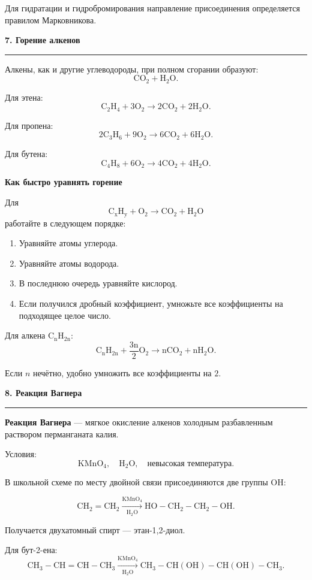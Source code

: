 \documentclass[a4paper,12pt]{article}
\newcommand{\topic}[1]{%
    \vspace{0.5em}
    {\Large\bfseries\textcolor{darkaccent}{#1}}\par
    \vspace{0.25em}
    {\color{accent}\rule{\linewidth}{0.7pt}}
    \vspace{0.4em}
}
\newcommand{\subtopic}[1]{%
    \vspace{0.35em}
    {\large\bfseries\textcolor{accent}{#1}}\par
}
\newcommand{\important}[1]{\textbf{\textcolor{darkaccent}{#1}}}
\begin{document}
Для гидратации и гидробромирования направление присоединения определяется правилом Марковникова.


\topic{7. Горение алкенов}

Алкены, как и другие углеводороды, при полном сгорании образуют:
\[
\boxed{\mathrm{CO_2+H_2O}}.
\]

Для этена:
\[
\mathrm{C_2H_4+3O_2\longrightarrow2CO_2+2H_2O}.
\]

Для пропена:
\[
\mathrm{2C_3H_6+9O_2\longrightarrow6CO_2+6H_2O}.
\]

Для бутена:
\[
\mathrm{C_4H_8+6O_2\longrightarrow4CO_2+4H_2O}.
\]

\subtopic{Как быстро уравнять горение}

Для
\[
\mathrm{C_xH_y+O_2\longrightarrow CO_2+H_2O}
\]
работайте в следующем порядке:

\begin{enumerate}
    \item Уравняйте атомы углерода.
    \item Уравняйте атомы водорода.
    \item В последнюю очередь уравняйте кислород.
    \item Если получился дробный коэффициент, умножьте все коэффициенты на подходящее целое число.
\end{enumerate}

Для алкена \(\mathrm{C_nH_{2n}}\):
\[
\mathrm{C_nH_{2n}+\frac{3n}{2}O_2
\longrightarrow nCO_2+nH_2O}.
\]

Если \(n\) нечётно, удобно умножить все коэффициенты на \(2\).


\topic{8. Реакция Вагнера}

\important{Реакция Вагнера} --- мягкое окисление алкенов холодным разбавленным раствором перманганата калия.

Условия:
\[
\mathrm{KMnO_4},\quad \mathrm{H_2O},\quad
\text{невысокая температура}.
\]

В школьной схеме по месту двойной связи присоединяются две группы \(\mathrm{OH}\):

\[
\mathrm{CH_2=CH_2}
\xrightarrow[\mathrm{H_2O}]{\mathrm{KMnO_4}}
\mathrm{HO-CH_2-CH_2-OH}.
\]

Получается двухатомный спирт --- этан-1,2-диол.

Для бут-2-ена:
\[
\mathrm{CH_3-CH=CH-CH_3}
\xrightarrow[\mathrm{H_2O}]{\mathrm{KMnO_4}}
\mathrm{CH_3-CH(OH)-CH(OH)-CH_3}.
\]
\end{document}
